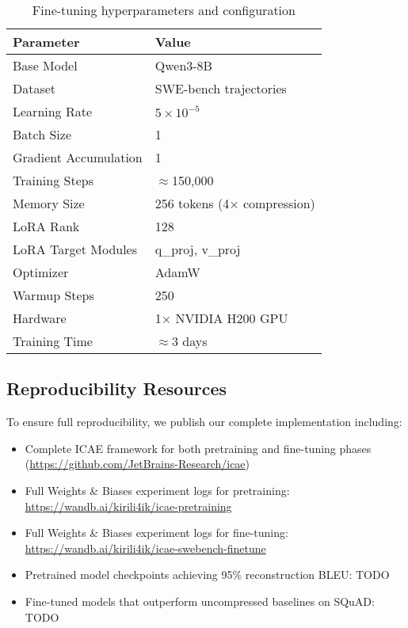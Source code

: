 \begin{table}[h]
    \centering
    \small
    \begin{tabular}{ll}
        \toprule
        \textbf{Parameter} & \textbf{Value} \\
        \midrule
        Base Model & Qwen3-8B \\
        Dataset & SWE-bench trajectories \\
        Learning Rate & $5 \times 10^{-5}$ \\
        Batch Size & 1 \\
        Gradient Accumulation & 1 \\
        Training Steps & $\approx$150,000 \\
        Memory Size & 256 tokens (4× compression) \\
        LoRA Rank & 128 \\
        LoRA Target Modules & q\_proj, v\_proj \\
        Optimizer & AdamW \\
        Warmup Steps & 250 \\
        Hardware & 1× NVIDIA H200 GPU \\
        Training Time & $\approx$3 days \\
        \bottomrule
    \end{tabular}
    \caption{Fine-tuning hyperparameters and configuration}
    \label{tab:finetune_config}
\end{table}

\subsection{Reproducibility Resources}

To ensure full reproducibility, we publish our complete implementation including:
\begin{itemize}
    \item Complete ICAE framework for both pretraining and fine-tuning phases (\url{https://github.com/JetBrains-Research/icae})
    \item Full Weights \& Biases experiment logs for pretraining: \url{https://wandb.ai/kirili4ik/icae-pretraining}
    \item Full Weights \& Biases experiment logs for fine-tuning: \url{https://wandb.ai/kirili4ik/icae-swebench-finetune}
    \item Pretrained model checkpoints achieving 95\% reconstruction BLEU: TODO
    \item Fine-tuned models that outperform uncompressed baselines on SQuAD: TODO
\end{itemize}


